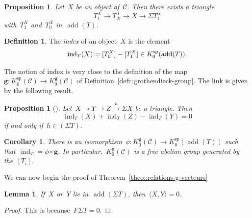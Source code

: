 \documentclass{amsart}
\newtheorem{corollary}[theorem]{Corollary}
\newtheorem{proposition}[theorem]{Proposition}
\newtheorem{lemma}[theorem]{Lemma}
\theoremstyle{definition}
\newtheorem{definition}[theorem]{Definition}
\renewcommand{\b}[1]{{\boldsymbol{#1}}} %
\newcommand{\eqdef}{\mbox{\,\raisebox{0.2ex}{\scriptsize\ensuremath{\mathrm:}}\ensuremath{=}\,}} %
\newcommand{\darkblue}{\color{darkblue}} %
\newcommand{\defn}[1]{\textsl{\darkblue #1}} %
\newcommand{\cat}{\mathcal{C}}
\newcommand{\susp}{\Sigma}
\newcommand{\add}{\operatorname{add}}
\newcommand{\spl}{\operatorname{sp}}
\newcommand{\Ksp}{K_0^{\spl}}
\newcommand{\Kg}{K_0^{\b{g}}}
\newcommand{\ind}{\operatorname{ind}}
\begin{document}
\begin{proposition}
 Let~$X$ be an object of~$\cat$. Then there exists a triangle
 \[
  T_1^X \to T^0_X \to X \to \susp T_1^X
 \]
 with~$T_1^X$ and~$T_0^X$ in~$\add(T)$.

\end{proposition}

\begin{definition}
 The \defn{index} of an object~$X$ is the element
 \[
  \ind_T(X) \eqdef [T_0^X] - [T_1^X] \in \Ksp(\add(T)).
 \]
\end{definition}

The notion of index is very close to the definition of the map~$\b g:\Ksp(\cat)\to \Kg(\cat)$ of Definition~\ref{defi::grothendieck-group}.  The link is given by the following result.

\begin{proposition}[\cite{Palu}]
 Let~$X\xrightarrow{} Y \xrightarrow{} Z \xrightarrow{h} \susp X$ be a triangle.
 Then
 \[
  \ind_T(X) + \ind_T(Z) - \ind_T(Y) = 0
 \]
 if and only if~$h\in (\susp T)$.
\end{proposition}

\begin{corollary}
\label{coro::grothendieck-g-vectors}
 There is an isomorphism~$\phi:\Kg(\cat) \to \Ksp(\add(T))$ such that~$\ind_T = \phi\circ \b g$.  In particular,~$\Kg(\cat)$ is a free abelian group generated by the~$[T_i]$.
\end{corollary}

We can now begin the proof of Theorem~\ref{theo::relations-g-vecteurs}

\begin{lemma}
\label{lemm::bilinear-form-suspention-T}
 If~$X$ or~$Y$ lie in~$\add(\susp T)$, then~$\langle X, Y \rangle = 0$.
\end{lemma}
\begin{proof}
 This is because~$F\susp T = 0$.
\end{proof}
\end{document}
